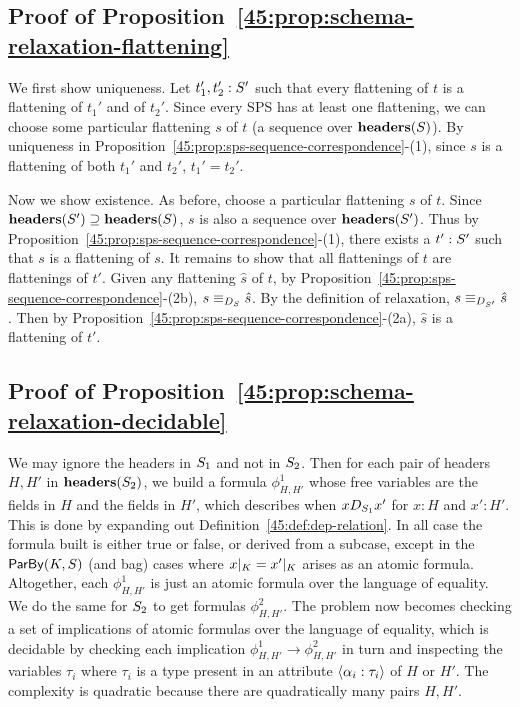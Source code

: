 
\subsection*{Proof of Proposition~\ref{45:prop:schema-relaxation-flattening}}

We first show uniqueness. Let $t_1', t_2': \ss'$
such that every flattening of $t$ is a flattening of $t_1'$ and of $t_2'$.
Since every SPS has at least one flattening,
we can choose some particular flattening $s$ of $t$
(a sequence over $\headers(\ss)$).
By uniqueness in Proposition~\ref{45:prop:sps-sequence-correspondence}-(1),
since $s$ is a flattening of both $t_1'$ and $t_2'$, $t_1' = t_2'$.

Now we show existence.
As before, choose a particular flattening $s$ of $t$.
Since $\headers(\ss') \supseteq \headers(\ss)$,
$s$ is also a sequence over $\headers(\ss')$.
Thus by Proposition~\ref{45:prop:sps-sequence-correspondence}-(1),
there exists a $t': \ss'$ such that $s$ is a flattening
of $s$.
It remains to show that all flattenings of $t$ are flattenings of $t'$.
Given any flattening $\hat{s}$ of $t$,
by Proposition~\ref{45:prop:sps-sequence-correspondence}-(2b),
$s \equiv_{D_{\ss}} \hat{s}$.
By the definition of relaxation,
$s \equiv_{D_{\ss'}} \hat{s}$.
Then by Proposition~\ref{45:prop:sps-sequence-correspondence}-(2a),
$\hat{s}$ is a flattening of $t'$.

\subsection*{Proof of Proposition~\ref{45:prop:schema-relaxation-decidable}}

We may ignore the headers in $\ss_1$ and not in $\ss_2$.
Then for each pair of headers $H, H'$ in $\headers(\ss_2)$,
we build a formula $\phi^1_{H, H'}$ whose free variables are the fields
in $H$ and the fields in $H'$,
which describes when
$x D_{\ss_1} x'$ for $x : H$ and $x' : H'$.
This is done by expanding out Definition~\ref{45:def:dep-relation}.
In all case the formula built is either true or false, or derived
from a subcase,
except in the $\keyby{K}{S}$ (and bag) cases where
$\tuprestrict{x}{K} = \tuprestrict{x'}{K}$ arises as an atomic
formula.
Altogether, each $\phi^1_{H, H'}$ is just an atomic formula over the
language of equality.
We do the same for $\ss_2$ to get formulas $\phi^2_{H, H'}$.
The problem now becomes checking a set of implications
of atomic formulas over the language of equality, which is
decidable by checking each implication
$\phi^1_{H, H'} \to \phi^2_{H, H'}$
in turn
and inspecting the variables $\tau_i$ where $\tau_i$ is
a type present in an attribute $\hdrfield{\alpha_i}{\tau_i}$ of $H$ or $H'$.
The complexity is quadratic because there are quadratically many pairs $H, H'$.

